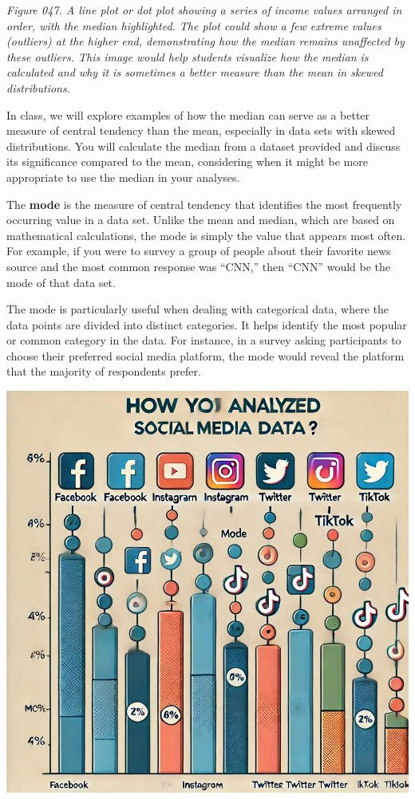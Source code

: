 \documentclass[
]{book}
\begin{document}
\emph{Figure 047. A line plot or dot plot showing a series of income values arranged in order, with the median highlighted. The plot could show a few extreme values (outliers) at the higher end, demonstrating how the median remains unaffected by these outliers. This image would help students visualize how the median is calculated and why it is sometimes a better measure than the mean in skewed distributions.}

In class, we will explore examples of how the median can serve as a better measure of central tendency than the mean, especially in data sets with skewed distributions. You will calculate the median from a dataset provided and discuss its significance compared to the mean, considering when it might be more appropriate to use the median in your analyses.

The \textbf{mode} is the measure of central tendency that identifies the most frequently occurring value in a data set. Unlike the mean and median, which are based on mathematical calculations, the mode is simply the value that appears most often. For example, if you were to survey a group of people about their favorite news source and the most common response was ``CNN,'' then ``CNN'' would be the mode of that data set.

The mode is particularly useful when dealing with categorical data, where the data points are divided into distinct categories. It helps identify the most popular or common category in the data. For instance, in a survey asking participants to choose their preferred social media platform, the mode would reveal the platform that the majority of respondents prefer.

\includegraphics[width=1\textwidth,height=\textheight]{images/fig048.jpg}
\end{document}
